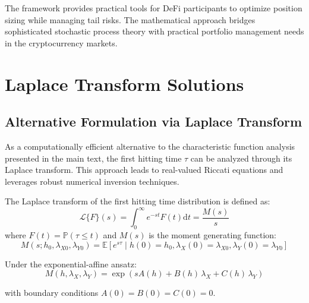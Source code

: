 \documentclass{article}
\renewcommand{\P}{\mathbb{P}}
\newcommand{\diff}{\mathrm{d}}
\theoremstyle{definition}
\begin{document}
The framework provides practical tools for DeFi participants to optimize position sizing while managing tail risks. The mathematical approach bridges sophisticated stochastic process theory with practical portfolio management needs in the cryptocurrency markets.


\appendix

\section{Laplace Transform Solutions}
\label{sec:laplace_transform}

\subsection{Alternative Formulation via Laplace Transform}

As a computationally efficient alternative to the characteristic function analysis presented in the main text, the first hitting time $\tau$ can be analyzed through its Laplace transform. This approach leads to real-valued Riccati equations and leverages robust numerical inversion techniques.

The Laplace transform of the first hitting time distribution is defined as:
\begin{equation}
\mathcal{L}\{F\}(s) = \int_0^{\infty} e^{-st} F(t) \diff t = \frac{M(s)}{s}
\end{equation}
where $F(t) = \P(\tau \leq t)$ and $M(s)$ is the moment generating function:
\begin{equation}
M(s; h_0, \lambda_{X0}, \lambda_{Y0}) = \mathbb{E}[e^{s\tau} \mid h(0) = h_0, \lambda_X(0) = \lambda_{X0}, \lambda_Y(0) = \lambda_{Y0}]
\end{equation}

Under the exponential-affine ansatz:
\begin{equation}
M(h, \lambda_X, \lambda_Y) = \exp\!\left( s A(h) + B(h)\,\lambda_X + C(h)\,\lambda_Y \right)
\end{equation}

with boundary conditions $A(0) = B(0) = C(0) = 0$.
\end{document}
